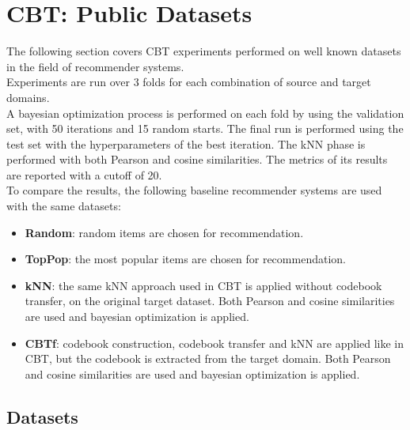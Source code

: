 \clearpage



\section{CBT: Public Datasets}

The following section covers CBT experiments performed on well known datasets in the field of recommender systems.\\
Experiments are run over 3 folds for each combination of source and target domains.\\
A bayesian optimization process is performed on each fold by using the validation set, with 50 iterations and 15 random starts. The final run is performed using the test set with the hyperparameters of the best iteration. The kNN phase is performed with both Pearson and cosine similarities. The metrics of its results are reported with a cutoff of 20.\\
To compare the results, the following baseline recommender systems are used with the same datasets:
\begin{itemize}
\item \textbf{Random}: random items are chosen for recommendation.
\item \textbf{TopPop}: the most popular items are chosen for recommendation.
\item \textbf{kNN}: the same kNN approach used in CBT is applied without codebook transfer, on the original target dataset. Both Pearson and cosine similarities are used and bayesian optimization is applied.
\item \textbf{CBTf}: codebook construction, codebook transfer and kNN are applied like in CBT, but the codebook is extracted from the target domain. Both Pearson and cosine similarities are used and bayesian optimization is applied.
\end{itemize}


\subsection{Datasets}

